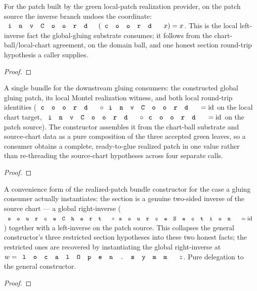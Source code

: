 \begin{lemma}
\label{lem:montel-realization-invcoord-coord}
For the patch built by the green local-patch realization provider, on the patch
source the inverse branch undoes the coordinate:
\(\code{invCoord}(\code{coord}\,x)=x\). This is the local left-inverse fact the
global-gluing substrate consumes; it follows from the chart-ball/local-chart
agreement,  on the domain ball, and one
honest section round-trip hypothesis a caller supplies.
\leanok
\end{lemma}
\begin{proof}\leanok\end{proof}

\begin{lemma}
\label{lem:montel-realized-patch-bundle}
A single bundle for the downstream gluing consumers: the constructed global
gluing patch, its local Montel realization witness, and both local round-trip
identities (\(\code{coord}\circ\code{invCoord}=\mathrm{id}\) on the local chart
target, \(\code{invCoord}\circ\code{coord}=\mathrm{id}\) on the patch source). The
constructor assembles it from the chart-ball substrate and source-chart data as a
pure composition of the three accepted green leaves, so a consumer obtains a
complete, ready-to-glue realized patch in one value rather than re-threading the
source-chart hypotheses across four separate calls.
\leanok
\end{lemma}
\begin{proof}\leanok\end{proof}

\begin{lemma}
\label{lem:montel-realized-patch-section-form}
A convenience form of the realized-patch bundle constructor for the case a gluing
consumer actually instantiates: the section is a genuine two-sided inverse of the
source chart — a global right-inverse
(\(\code{sourceChart}\circ\code{sourceSection}=\mathrm{id}\)) together with a
left-inverse on the patch source. This collapses the general constructor's three
restricted section hypotheses into these two honest facts; the restricted ones are
recovered by instantiating the global right-inverse at
\(w=\code{localOpen.symm}\,z\). Pure delegation to the general constructor.
\leanok
\end{lemma}
\begin{proof}\leanok\end{proof}

